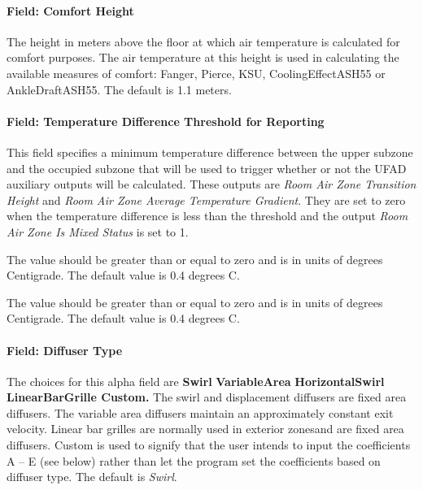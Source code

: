 \paragraph{Field: Comfort Height}\label{field-comfort-height-2}

The height in meters above the floor at which air temperature is calculated for comfort purposes. The air temperature at this height is used in calculating the available measures of comfort: Fanger, Pierce, KSU, CoolingEffectASH55 or AnkleDraftASH55. The default is 1.1 meters.

\paragraph{Field: Temperature Difference Threshold for Reporting}\label{field-temperature-difference-threshold-for-reporting-2}

This field specifies a minimum temperature difference between the upper subzone and the occupied subzone that will be used to trigger whether or not the UFAD auxiliary outputs will be calculated. These outputs are \emph{Room Air Zone Transition Height} and \emph{Room Air Zone Average Temperature Gradient}. They are set to zero when the temperature difference is less than the threshold and the output \emph{Room Air Zone Is Mixed Status} is set to 1.

The value should be greater than or equal to zero and is in units of degrees Centigrade. The default value is 0.4 degrees C.

The value should be greater than or equal to zero and is in units of degrees Centigrade. The default value is 0.4 degrees C.

\paragraph{Field: Diffuser Type}\label{field-diffuser-type-1}

The choices for this alpha field are \textbf{Swirl} \textbar{} \textbf{VariableArea} \textbar{} \textbf{HorizontalSwirl \textbar{} LinearBarGrille \textbar{} Custom.} The swirl and displacement diffusers are fixed area diffusers. The variable area diffusers maintain an approximately constant exit velocity. Linear bar grilles are normally used in exterior zonesand are fixed area diffusers. Custom is used to signify that the user intends to input the coefficients A -- E (see below) rather than let the program set the coefficients based on diffuser type. The default is \emph{Swirl}.

